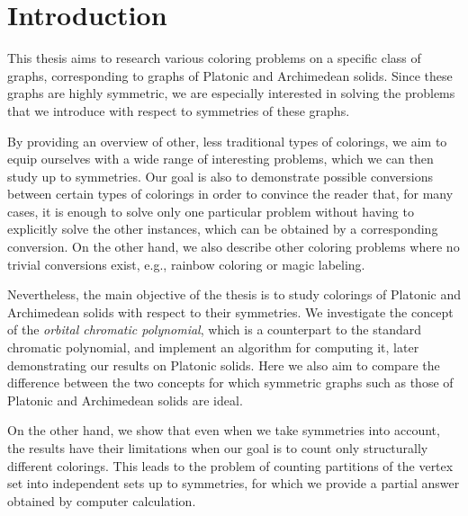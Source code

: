 \chapter*{Introduction}

This thesis aims to research various coloring problems on a specific class of graphs, corresponding to graphs of Platonic and Archimedean solids. Since these graphs are highly symmetric, we are especially interested in solving the problems that we introduce with respect to symmetries of these graphs.

By providing an overview of other, less traditional types of colorings, we aim to equip ourselves with a wide range of interesting problems, which we can then study up to symmetries. Our goal is also to demonstrate possible conversions between certain types of colorings in order to convince the reader that, for many cases, it is enough to solve only one particular problem without having to explicitly solve the other instances, which can be obtained by a corresponding conversion. On the other hand, we also describe other coloring problems where no trivial conversions exist, e.g., rainbow coloring or magic labeling.

Nevertheless, the main objective of the thesis is to study colorings of Platonic and Archimedean solids with respect to their symmetries. We investigate the concept of the \emph{orbital chromatic polynomial}, which is a counterpart to the standard chromatic polynomial, and implement an algorithm for computing it, later demonstrating our results on Platonic solids. Here we also aim to compare the difference between the two concepts for which symmetric graphs such as those of Platonic and Archimedean solids are ideal.

On the other hand, we show that even when we take symmetries into account, the results have their limitations when our goal is to count only structurally different colorings. This leads to the problem of counting partitions of the vertex set into independent sets up to symmetries, for which we provide a partial answer obtained by computer calculation.